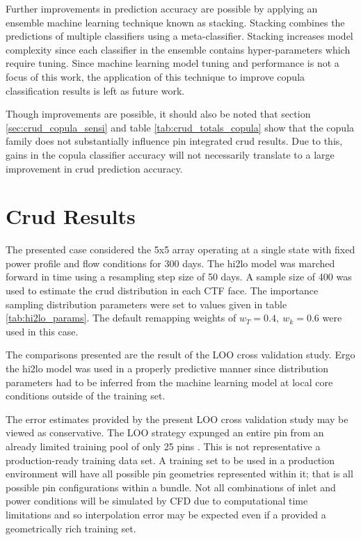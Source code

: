 Further improvements in prediction accuracy are possible by applying an ensemble
machine learning technique known as stacking.  Stacking combines the predictions of multiple classifiers using a meta-classifier.
Stacking increases model complexity since each classifier in the ensemble contains hyper-parameters which require tuning.
Since machine learning model tuning and performance is not a focus of this work, the application of this technique to improve copula classification results is left as future work.

Though improvements are possible, it should also be noted that section \ref{sec:crud_copula_sensi} and table \ref{tab:crud_totals_copula} show that the copula family does not substantially influence pin integrated crud results.  Due to this, gains in the copula classifier accuracy will not necessarily translate to a large improvement in crud prediction accuracy.

\section{Crud Results}

The presented case considered the 5x5 array operating at a single state with fixed power profile and flow conditions for 300 days.  The hi2lo model was marched forward in time using a resampling step size of 50 days.  A sample size of 400 was used to estimate the crud distribution in each CTF face.  The importance sampling distribution parameters were set to values given in table \ref{tab:hi2lo_params}.  The default remapping weights of $w_T=0.4, \ w_k=0.6$ were used in this case.

The comparisons presented are the result of the LOO cross validation study.
Ergo the hi2lo model was used in a properly predictive manner since distribution parameters had to be inferred from the machine learning model at local core conditions outside of the training set.

The error estimates provided by the present LOO cross validation study may be viewed as conservative.  The LOO strategy expunged an entire pin from an already limited training pool of only 25 pins . This is not representative a production-ready training data set.  A training set to be used in a production environment will have all possible pin geometries represented within it; that is all possible pin configurations within a bundle.  Not all combinations of inlet and power conditions will be simulated by CFD due to computational time limitations and so interpolation error may be expected even if a provided a geometrically rich training set.  

